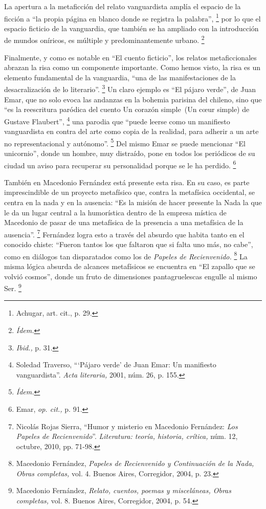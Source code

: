 \documentclass[14pt,twoside,final]{extbook} %
\let\oldfootnote\footnote
\renewcommand\footnote[1]{%
\oldfootnote{\hspace{1mm}#1}}
\begin{document}
La apertura a la metaficción del relato vanguardista amplía el espacio de la ficción a ``la propia página en blanco donde se registra la palabra'',\footnote{Achugar, art. cit., p. 29.} por lo que el espacio ficticio de la vanguardia, que también se ha ampliado con la introducción de mundos oníricos, es múltiple y predominantemente urbano.\footnote{\em Ídem.}

Finalmente, y como es notable en ``El cuento ficticio'', los relatos metaficcionales abrazan la risa como un componente importante. Como hemos visto, la risa es un elemento fundamental de la vanguardia, ``una de las manifestaciones de la desacralización de lo literario''.\footnote{\emph{Ibid.,} p. 31.} Un claro ejemplo es ``El pájaro verde'', de Juan Emar, que no solo evoca las andanzas en la bohemia parisina del chileno, sino que ``es la reescritura paródica del cuento \textquotesingle\textquotesingle Un corazón simple\textquotesingle\textquotesingle\ (\textquotesingle\textquotesingle Un c\oe ur simple\textquotesingle\textquotesingle) de Gustave Flaubert'',\footnote{Soledad Traverso, ```Pájaro verde' de Juan Emar: Un manifiesto vanguardista''. \emph{Acta literaria,} 2001, núm. 26, p. 155.} una parodia que ``puede leerse como un manifiesto vanguardista en contra del arte como copia de la realidad, para adherir a un arte no representacional y autónomo''.\footnote{\em Ídem.} Del mismo Emar se puede mencionar ``El unicornio'', donde un hombre, muy distraído, pone en todos los periódicos de su ciudad un aviso para recuperar su personalidad porque se le ha perdido.\footnote{Emar, \emph{op. cit.,} p. 91.}

También en Macedonio Fernández está presente esta risa. En su caso, es parte imprescindible de un proyecto metafísico que, contra la metafísica occidental, se centra en la nada y en la ausencia: ``Es la misión de hacer presente la Nada la que le da un lugar central a la humorística dentro de la empresa mística de Macedonio de pasar de una metafísica de la presencia a una metafísica de la ausencia''.\footnote{Nicolás Rojas Sierra, ``Humor y misterio en Macedonio Fernández: \emph{Los Papeles de Recienvenido}''. \emph{Literatura: teoría, historia, crítica,} núm. 12, octubre, 2010, pp. 71-98.} Fernández logra esto a través del absurdo que habita tanto en el conocido chiste: ``Fueron tantos los que faltaron que si falta uno más, no cabe'', como en diálogos tan disparatados como los de \emph{Papeles de Recienvenido.}\footnote{Macedonio Fernández, \emph{Papeles de Recienvenido y Continuación de la Nada, Obras completas,} vol. 4. Buenos Aires, Corregidor, 2004, p. 23.} La misma lógica absurda de alcances metafísicos se encuentra en ``El zapallo que se volvió cosmos'', donde un fruto de dimensiones pantagruelescas engulle al mismo Ser.\footnote{Macedonio Fernández, \emph{Relato, cuentos, poemas y misceláneas, Obras completas,} vol. 8. Buenos Aires, Corregidor, 2004, p. 54.}
\end{document}
